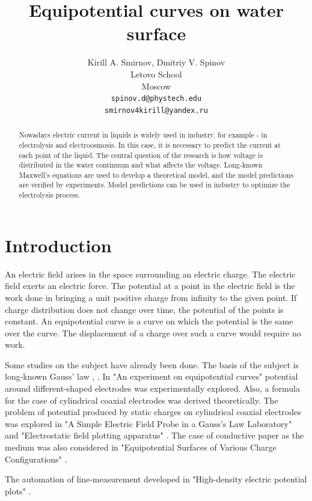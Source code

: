 \documentclass{article}
\title{Equipotential curves on water surface}
\author{
  Kirill A. Smirnov, Dmitriy V. Spinov \\
  Letovo School \\
  Moscow\\
  \texttt{spinov.d@phystech.edu} \\
  \texttt{smirnov4kirill@yandex.ru} \\
}
\begin{document}
\maketitle


\begin{abstract}
Nowadays electric current in liquids is widely used in industry, for example - in electrolysis and electroosmosis. In this case, it is necessary to predict the current at each point of the liquid. The central question of the research is how voltage is distributed in the water continuum and what affects the voltage. Long-known Maxwell's equations are used to develop a theoretical model, and the model predictions are verified by experiments. Model predictions can be used in industry to optimize the electrolysis process.
\end{abstract}


\section{Introduction}            %
An electric field arises in the space surrounding an electric charge. The electric field exerts an electric force. The potential at a point in the electric field is the work done in bringing a unit positive charge from infinity to the given point. If charge distribution does not change over time, the potential of the points is constant. An equipotential curve is a curve on which the potential is the same over the curve. The displacement of a charge over such a curve would require no work.\par

Some studies on the subject have already been done. The basis of the subject is long-known Gauss' law \cite{gauss}, \cite{landavshic}. In "An experiment on equipotential curves"\cite{khaparde} potential around different-shaped electrodes was experimentally explored. Also, a formula for the case of cylindrical coaxial electrodes was derived theoretically. The problem of potential produced by static charges on cylindrical coaxial electrodes was explored in "A Simple Electric Field Probe in a Gauss's Law Laboratory"\cite{ludwigsen} and "Electrostatic field plotting apparatus" \cite{smith}. The case of conductive paper as the medium was also considered in "Equipotential Surfaces of Various Charge Configurations" \cite{beyond}.

The automation of line-measurement developed in "High-density electric potential plots" \cite{binder2015high}.
\end{document}
